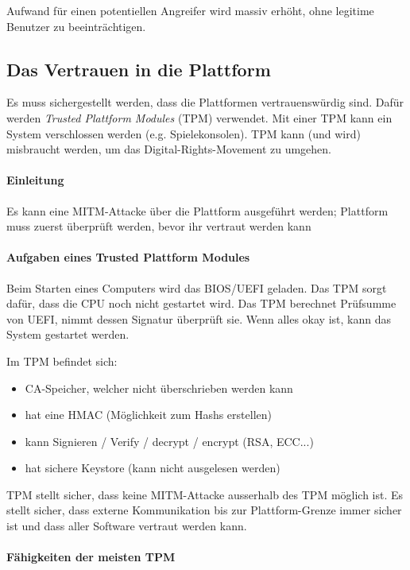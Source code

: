 \documentclass[a4paper,12pt]{article}
\begin{document}
Aufwand für einen potentiellen Angreifer wird massiv erhöht, ohne legitime Benutzer zu beeinträchtigen.

\subsection{Das Vertrauen in die Plattform}
Es muss sichergestellt werden, dass die Plattformen vertrauenswürdig sind. Dafür werden \emph{Trusted Plattform Modules} (TPM) verwendet. Mit einer TPM kann ein System verschlossen werden (e.g. Spielekonsolen). TPM kann (und wird) misbraucht werden, um das Digital-Rights-Movement zu umgehen.

\paragraph{Einleitung}
Es kann eine MITM-Attacke über die Plattform ausgeführt werden; Plattform muss zuerst überprüft werden, bevor ihr vertraut werden kann

\paragraph{Aufgaben eines Trusted Plattform Modules}
Beim Starten eines Computers wird das BIOS/UEFI geladen. Das TPM sorgt dafür, dass die CPU noch nicht gestartet wird. Das TPM berechnet Prüfsumme von UEFI, nimmt dessen Signatur überprüft sie. Wenn alles okay ist, kann das System gestartet werden.

Im TPM befindet sich:
\begin{itemize}
\item CA-Speicher, welcher nicht überschrieben werden kann
\item hat eine HMAC (Möglichkeit zum Hashs erstellen)
\item kann Signieren / Verify / decrypt / encrypt (RSA, ECC...)
\item hat sichere Keystore (kann nicht ausgelesen werden)
\end{itemize}

TPM stellt sicher, dass keine MITM-Attacke ausserhalb des TPM möglich ist. Es stellt sicher, dass externe Kommunikation bis zur Plattform-Grenze immer sicher ist und dass aller Software vertraut werden kann.

\paragraph{Fähigkeiten der meisten TPM}
\end{document}
